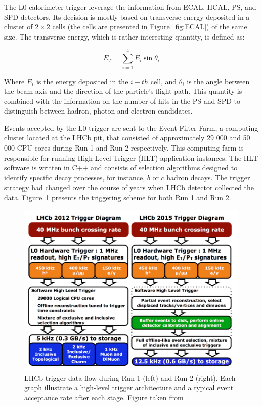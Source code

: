 The L0 calorimeter trigger leverage the information from ECAL, HCAL, PS, and  SPD detectors. Its decision is mostly based on transverse energy deposited in a cluster of $2\times 2$ cells (the cells are presented in Figure~\ref{fig:ECAL}) of the same size. The transverse energy, which is rather interesting quantity, is defined as:

\begin{equation}
    E_T = \sum_{i=1}^{4} E_i \sin\theta_i
\end{equation}

Where $E_i$ is the energy deposited in the $i-th$ cell, and $\theta_i$ is the angle between the beam axis and the direction of the particle's flight path. 
This quantity is combined with the information on the number of hits in the PS and SPD to distinguish between hadron, photon and electron candidates. 


Events accepted by the L0 trigger are sent to the Event Filter Farm, a computing cluster located at the LHCb pit, that consisted of approximately 29 000 and 50 000 CPU cores during Run 1 and Run 2 respectively. This computing farm is responsible for running High Level Trigger (HLT) application instances. The HLT software is written in C++ and consists of selection algorithms designed to identify specific decay processes, for instance, $b$ or $c$ hadron decays. The trigger strategy had changed over the course of years when LHCb detector collected the data. Figure~\ref{fig:trigger} presents the triggering scheme for both Run 1 and Run 2. 


\begin{figure}
\centering
\includegraphics[width=\linewidth]{figures/trigger.PNG}
\caption{LHCb trigger data flow during Run 1 (left) and Run 2 (right). Each graph illustrate a high-level trigger architecture and a typical event acceptance rate after each stage. Figure taken from~\cite{trigger_schame}.
\label{fig:trigger}}
\end{figure}

